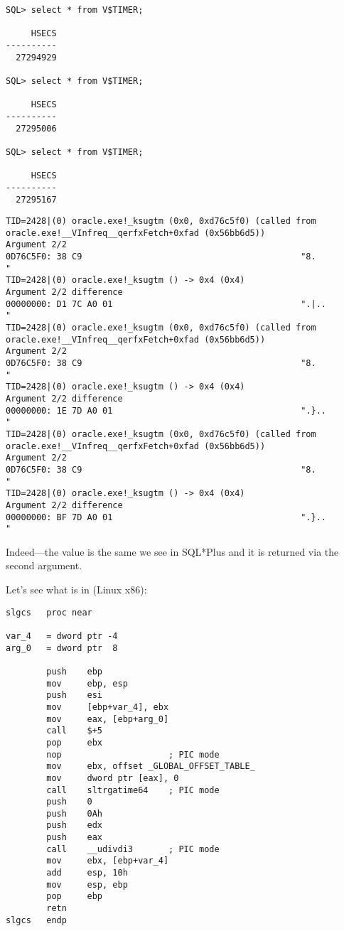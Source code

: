 \begin{lstlisting}
SQL> select * from V$TIMER;

     HSECS
----------
  27294929

SQL> select * from V$TIMER;

     HSECS
----------
  27295006

SQL> select * from V$TIMER;

     HSECS
----------
  27295167
\end{lstlisting}

\begin{lstlisting}[caption=\tracer output]
TID=2428|(0) oracle.exe!_ksugtm (0x0, 0xd76c5f0) (called from oracle.exe!__VInfreq__qerfxFetch+0xfad (0x56bb6d5))
Argument 2/2
0D76C5F0: 38 C9                                           "8.              "
TID=2428|(0) oracle.exe!_ksugtm () -> 0x4 (0x4)
Argument 2/2 difference
00000000: D1 7C A0 01                                     ".|..            "
TID=2428|(0) oracle.exe!_ksugtm (0x0, 0xd76c5f0) (called from oracle.exe!__VInfreq__qerfxFetch+0xfad (0x56bb6d5))
Argument 2/2
0D76C5F0: 38 C9                                           "8.              "
TID=2428|(0) oracle.exe!_ksugtm () -> 0x4 (0x4)
Argument 2/2 difference
00000000: 1E 7D A0 01                                     ".}..            "
TID=2428|(0) oracle.exe!_ksugtm (0x0, 0xd76c5f0) (called from oracle.exe!__VInfreq__qerfxFetch+0xfad (0x56bb6d5))
Argument 2/2
0D76C5F0: 38 C9                                           "8.              "
TID=2428|(0) oracle.exe!_ksugtm () -> 0x4 (0x4)
Argument 2/2 difference
00000000: BF 7D A0 01                                     ".}..            "
\end{lstlisting}

Indeed---the value is the same we see in SQL*Plus and it is returned via the second argument.

Let's see what is in  (Linux x86):

\begin{lstlisting}[style=customasmx86]
slgcs   proc near

var_4   = dword ptr -4
arg_0   = dword ptr  8

        push    ebp
        mov     ebp, esp
        push    esi
        mov     [ebp+var_4], ebx
        mov     eax, [ebp+arg_0]
        call    $+5
        pop     ebx
        nop                     ; PIC mode
        mov     ebx, offset _GLOBAL_OFFSET_TABLE_
        mov     dword ptr [eax], 0
        call    sltrgatime64    ; PIC mode
        push    0
        push    0Ah
        push    edx
        push    eax
        call    __udivdi3       ; PIC mode
        mov     ebx, [ebp+var_4]
        add     esp, 10h
        mov     esp, ebp
        pop     ebp
        retn
slgcs   endp
\end{lstlisting}

